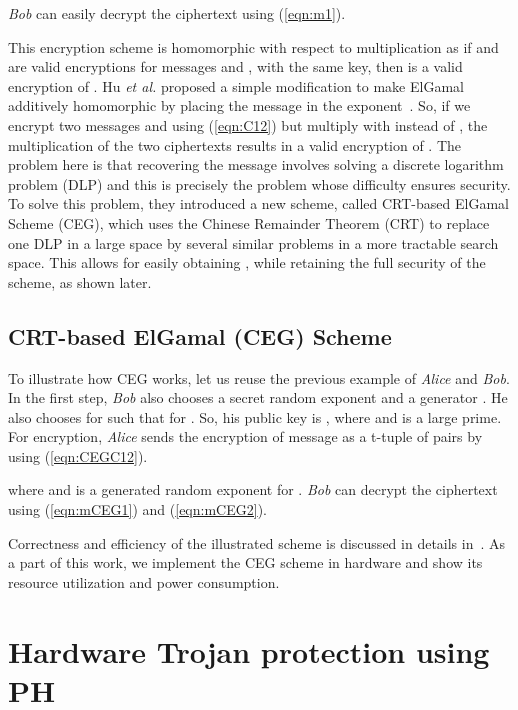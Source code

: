 \documentclass[conference]{IEEEtran}
\begin{document}
\noindent \textit{Bob} can easily decrypt the ciphertext using (\ref{eqn:m1}).



\noindent This encryption scheme is homomorphic with respect to multiplication as if  and  are valid encryptions for messages  and , with the same key, then  is a valid encryption of . Hu \textit{et al.} proposed a simple modification to make ElGamal additively homomorphic by placing the message  in the exponent{\color{blue}~\cite{homoCRT}}. So, if we encrypt two messages  and  using (\ref{eqn:C12}) but multiply  with  instead of , the multiplication of the two ciphertexts results in a valid encryption of . The problem here is that recovering the message involves solving a discrete logarithm problem (DLP) and this is precisely the problem whose difficulty ensures security. To solve this problem, they introduced a new scheme, called CRT-based ElGamal Scheme (CEG), which uses the Chinese Remainder Theorem (CRT) to replace one DLP in a large space by several similar problems in a more tractable search space. This allows for easily obtaining , while retaining the full security of the scheme, as shown later.
 
\subsection{CRT-based ElGamal (CEG) Scheme}
To illustrate how CEG works, let us reuse the previous example of \textit{Alice} and \textit{Bob}. In the first step, \textit{Bob} also chooses a secret random exponent  and a generator . He also chooses  for  such that  for . So, his public key is , where  and  is a large prime. For encryption, \textit{Alice} sends the encryption of message  as a t-tuple of pairs  by using (\ref{eqn:CEGC12}).





\noindent where  and  is a generated random exponent for . \textit{Bob} can decrypt the ciphertext using (\ref{eqn:mCEG1}) and (\ref{eqn:mCEG2}).






\noindent Correctness and efficiency of the illustrated scheme is discussed in details in{\color{blue}~\cite{homoCRT}}. As a part of this work, we implement the CEG scheme in hardware and show its resource utilization and power consumption.
\section{Hardware Trojan protection using PH} \label{sec:prot}
\end{document}
